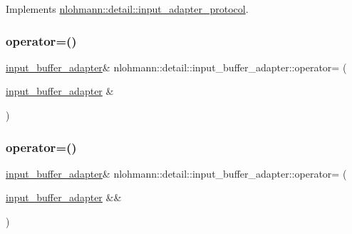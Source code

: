 Implements \mbox{\hyperlink{structnlohmann_1_1detail_1_1input__adapter__protocol_aac10a6a4048a8ce8e2ed50277692a3ca}{nlohmann\+::detail\+::input\+\_\+adapter\+\_\+protocol}}.

\mbox{\label{classnlohmann_1_1detail_1_1input__buffer__adapter_a0871125057d993684ba8e45fb2b8a76b}} 
\subsubsection{\texorpdfstring{operator=()}{operator=()}\hspace{0.1cm}{\footnotesize\ttfamily [1/2]}}
{\footnotesize\ttfamily \mbox{\hyperlink{classnlohmann_1_1detail_1_1input__buffer__adapter}{input\+\_\+buffer\+\_\+adapter}}\& nlohmann\+::detail\+::input\+\_\+buffer\+\_\+adapter\+::operator= (\begin{DoxyParamCaption}\item[{\mbox{\hyperlink{classnlohmann_1_1detail_1_1input__buffer__adapter}{input\+\_\+buffer\+\_\+adapter}} \&}]{ }\end{DoxyParamCaption})\hspace{0.3cm}{\ttfamily [delete]}}

\mbox{\label{classnlohmann_1_1detail_1_1input__buffer__adapter_a19bb3ff68048a2fc8ecc41a013af37ae}} 
\subsubsection{\texorpdfstring{operator=()}{operator=()}\hspace{0.1cm}{\footnotesize\ttfamily [2/2]}}
{\footnotesize\ttfamily \mbox{\hyperlink{classnlohmann_1_1detail_1_1input__buffer__adapter}{input\+\_\+buffer\+\_\+adapter}}\& nlohmann\+::detail\+::input\+\_\+buffer\+\_\+adapter\+::operator= (\begin{DoxyParamCaption}\item[{\mbox{\hyperlink{classnlohmann_1_1detail_1_1input__buffer__adapter}{input\+\_\+buffer\+\_\+adapter}} \&\&}]{ }\end{DoxyParamCaption})\hspace{0.3cm}{\ttfamily [delete]}}



